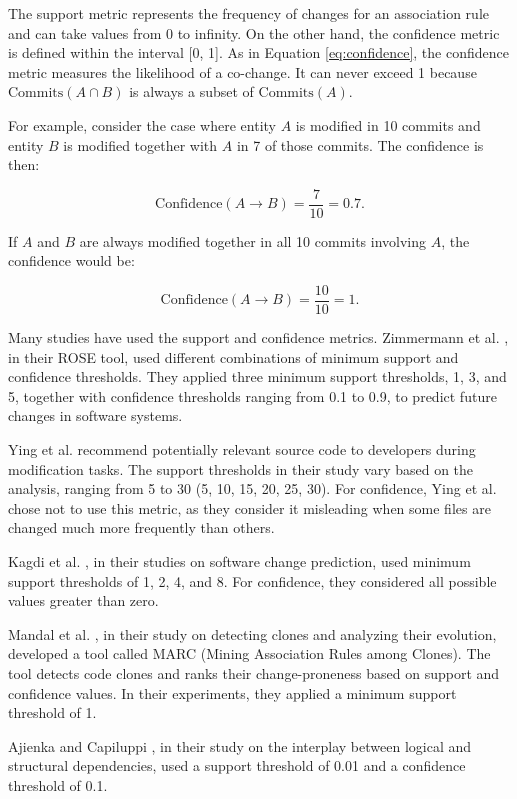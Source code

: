 The support metric represents the frequency of changes for an association rule and can take values from 0 to infinity. On the other hand, the confidence metric is defined within the interval [0, 1]. As in Equation \eqref{eq:confidence}, the confidence metric measures the likelihood of a co-change. It can never exceed 1 because $\text{Commits}(A \cap B)$ is always a subset of $\text{Commits}(A)$.


 For example, consider the case where entity $A$ is modified in 10 commits and entity $B$ is modified together with $A$ in 7 of those commits. The confidence is then:

\[
\text{Confidence}(A \rightarrow B) = \frac{7}{10} = 0.7.
\]

If $A$ and $B$ are always modified together in all 10 commits involving $A$, the confidence would be:

\[
\text{Confidence}(A \rightarrow B) = \frac{10}{10} = 1.
\]



Many studies have used the support and confidence metrics. Zimmermann et al. \cite{Zimmermann:2004:MVH:998675.999460}, in their ROSE tool, used different combinations of minimum support and confidence thresholds. They applied three minimum support thresholds, 1, 3, and 5, together with confidence thresholds ranging from 0.1 to 0.9, to predict future changes in software systems.

Ying et al. \cite{Ying-co-change} recommend potentially relevant source code to developers during modification tasks. The support thresholds in their study vary based on the analysis, ranging from 5 to 30 (5, 10, 15, 20, 25, 30). For confidence, Ying et al. chose not to use this metric, as they consider it misleading when some files are changed much more frequently than others.

Kagdi et al. \cite{article-Kagdi-commit}, in their studies on software change prediction, used minimum support thresholds of 1, 2, 4, and 8. For confidence, they considered all possible values greater than zero.

Mandal et al. \cite{Mandal-clones}, in their study on detecting clones and analyzing their evolution, developed a tool called MARC (Mining Association Rules among Clones). The tool detects code clones and ranks their change-proneness based on support and confidence values. In their experiments, they applied a minimum support threshold of 1.

Ajienka and Capiluppi \cite{DBLP:journals/ese/AjienkaCC18}, in their study on the interplay between logical and structural dependencies, used a support threshold of 0.01 and a confidence threshold of 0.1.



